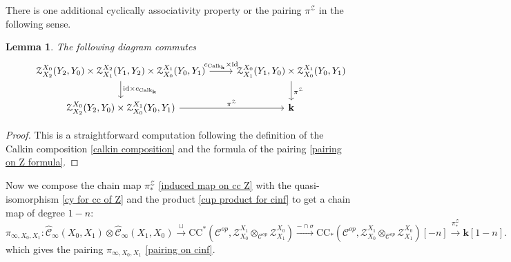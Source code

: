 \documentclass[11pt]{amsproc}
\def\K{{\mathbf{k}}}
\def\cZ{\mathcal{Z}}
\def\cc{\mathcal{C}}
\def\r#1{\mathrm{#1}}
\def\id{\mathrm{id}}
\def\calk{\mathrm{Calk}}
\def\cinf{\widehat{\cc}_{\infty}}
\newtheorem{lem}{Lemma}[section]
\theoremstyle{remark}
\numberwithin{equation}{section}
\begin{document}
There is one additional cyclically associativity property or the pairing $\pi^{\cZ}$ in the following sense.

\begin{lem}\label{lem: Z pairing associative}
The following diagram commutes
\begin{equation}
\begin{tikzcd}
& \cZ_{X_{2}}^{X_{0}}(Y_{2}, Y_{0}) \times \cZ_{X_{1}}^{X_{2}}(Y_{1}, Y_{2}) \times \cZ_{X_{0}}^{X_{1}}(Y_{0}, Y_{1}) \arrow[r, " c_{\calk_{\K}} \times \id"] \arrow[d, "\id \times c_{\calk_{\K}}"] & \cZ_{X_{1}}^{X_{0}}(Y_{1}, Y_{0}) \times \cZ_{X_{0}}^{X_{1}}(Y_{0}, Y_{1}) \arrow[d, "\pi^{\cZ}"] \\
& \cZ_{X_{2}}^{X_{0}}(Y_{2}, Y_{0}) \times \cZ_{X_{0}}^{X_{1}}(Y_{0}, Y_{1}) \arrow[r, "\pi^{\cZ}"] & \K
\end{tikzcd}
\end{equation}
\end{lem}
\begin{proof}
This is a straightforward computation following the definition of the Calkin composition \eqref{calkin composition} and the formula of the pairing \eqref{pairing on Z formula}.
\end{proof}

Now we compose the chain map $\pi^{\cZ}_{*}$ \eqref{induced map on cc Z}
with the quasi-isomorphism \eqref{cy for cc of Z} and the product \eqref{cup product for cinf} to get a chain map of degree $1-n$:
\begin{equation}\label{defining pairing on cinf}
\pi_{\infty, X_{0}, X_{1}}: \cinf(X_{0}, X_{1}) \otimes \cinf(X_{1}, X_{0}) \stackrel{\sqcup}\to  \r{CC}^{*}(\cc^{op}, \cZ_{X_{0}}^{X_{1}} \otimes_{\cc^{op}} \cZ_{X_{1}}^{X_{0}}) \stackrel{-\cap \sigma}\to \r{CC}_{*}(\cc^{op}, \cZ_{X_{0}}^{X_{1}} \otimes_{\cc^{op}} \cZ_{X_{1}}^{X_{0}})[-n] \stackrel{\pi^{\cZ}_{*}}\to \K[1-n].
\end{equation}
which gives the pairing $\pi_{\infty, X_{0}, X_{1}}$ \eqref{pairing on cinf}.
\end{document}

